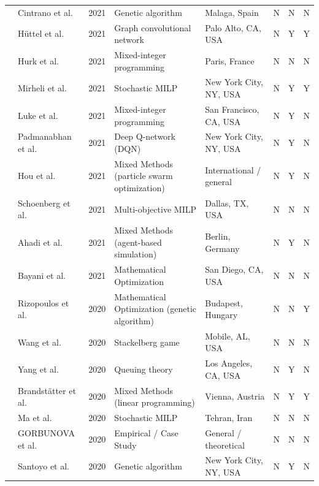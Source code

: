 \documentclass[letterpaper, 12pt, oneside, doublespacing]{Thesis}
\begin{document}
\begin{longtable}{L{0.9cm} L{1.8cm} L{0.7cm} L{2.5cm} L{2.1cm} L{0.7cm} L{0.7cm} L{0.7cm}}
\cite{citizen_centric_2021} & Cintrano et al. & 2021 & Genetic algorithm & Malaga, Spain & N & N & N \\
\cite{deep_spatio-temporal_2021} & H\"uttel et al. & 2021 & Graph convolutional network & Palo Alto, CA, USA & N & Y & Y \\
\cite{energy-optimal_design_2021} & Hurk et al. & 2021 & Mixed-integer programming & Paris, France & N & N & N \\
\cite{hierarchical_optimization_2021} & Mirheli et al. & 2021 & Stochastic MILP & New York City, NY, USA & N & Y & Y \\
\cite{joint_optimization_2021} & Luke et al. & 2021 & Mixed-integer programming & San Francisco, CA, USA & N & Y & N \\
\cite{optimal_placement_2021} & Padmanabhan et al. & 2021 & Deep Q-network (DQN) & New York City, NY, USA & N & Y & N \\
\cite{optimal_planning_2021} & Hou et al. & 2021 & Mixed Methods (particle swarm optimization) & International {\slash} general & N & Y & N \\
\cite{reducing_waiting_2021} & Schoenberg et al. & 2021 & Multi-objective MILP & Dallas, TX, USA & N & N & N \\
\cite{siting_and_2021} & Ahadi et al. & 2021 & Mixed Methods (agent-based simulation) & Berlin, Germany & N & Y & N \\
\cite{strategic_competition_2021} & Bayani et al. & 2021 & Mathematical Optimization & San Diego, CA, USA & N & N & N \\
\cite{a_method_2020} & Rizopoulos et al. & 2020 & Mathematical Optimization (genetic algorithm) & Budapest, Hungary & N & N & Y \\
\cite{double-layer_game_2020} & Wang et al. & 2020 & Stackelberg game & Mobile, AL, USA & N & N & N \\
\cite{dynamic_modeling_2020} & Yang et al. & 2020 & Queuing theory & Los Angeles, CA, USA & N & Y & N \\
\cite{location_of_2020} & Brandst\"atter et al. & 2020 & Mixed Methods (linear programming) & Vienna, Austria & N & Y & Y \\
\cite{optimal_fast_2020} & Ma et al. & 2020 & Stochastic MILP & Tehran, Iran & N & N & N \\
\cite{optimizing_the_2020} & GORBUNOVA et al. & 2020 & Empirical / Case Study & General {\slash} theoretical & N & N & N \\
\cite{resource_aware_2020} & Santoyo et al. & 2020 & Genetic algorithm & New York City, NY, USA & N & Y & N \\

\end{longtable}
\end{document}
